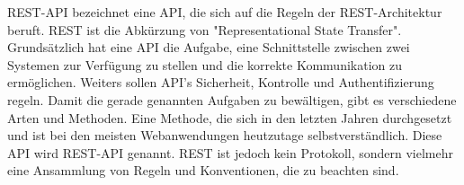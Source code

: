 
REST-API bezeichnet eine API, die sich auf die Regeln der REST-Architektur beruft. REST ist die Abkürzung von "Representational State Transfer". Grundsätzlich hat eine API die Aufgabe, eine Schnittstelle zwischen zwei Systemen zur Verfügung zu stellen und die korrekte Kommunikation zu ermöglichen. Weiters sollen API's Sicherheit, Kontrolle und Authentifizierung regeln. Damit die gerade genannten Aufgaben zu bewältigen, gibt es verschiedene Arten und Methoden. Eine Methode, die sich in den letzten Jahren durchgesetzt und ist bei den meisten Webanwendungen heutzutage selbstverständlich. Diese API wird REST-API genannt. REST ist jedoch kein Protokoll, sondern vielmehr eine Ansammlung von Regeln und Konventionen, die zu beachten sind. \cite{WikiREST}

